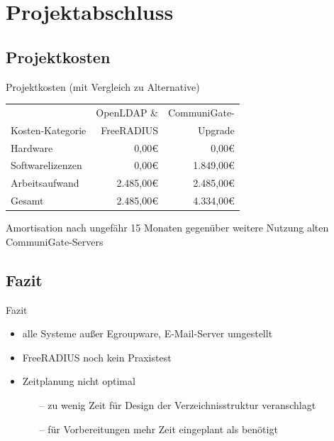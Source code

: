 \documentclass[presentation,svgnames,12pt]{beamer}
\begin{document}
\section{Projektabschluss}
\subsection{Projektkosten}
\begin{frame}{Projektkosten (mit Vergleich zu Alternative)}
\begin{table}
\centering
	\begin{tabularx}{0.9\textwidth}{|X|r|r|}
		\hline
		 	&	OpenLDAP \& &	CommuniGate-\\
		Kosten-Kategorie	&	FreeRADIUS &	Upgrade\\
		\hline
		Hardware &	0,00\euro{} &	0,00\euro{}\\
		\hline
		Softwarelizenzen &	0,00\euro{} &	1.849,00\euro{}\\
		\hline
		Arbeitsaufwand &	2.485,00\euro{} &	2.485,00\euro{}\\
		\hhline{|=|=|=|}
		Gesamt &	2.485,00\euro{} &	4.334,00\euro{}\\
		\hline
	\end{tabularx}
\end{table}
\bigskip
Amortisation nach ungefähr 15 Monaten gegenüber weitere Nutzung alten CommuniGate-Servers
\end{frame}

\subsection{Fazit}
\begin{frame}{Fazit}
\begin{itemize}
	\item alle Systeme außer Egroupware, E-Mail-Server umgestellt
	\item FreeRADIUS noch kein Praxistest
	\item Zeitplanung nicht optimal
	\vspace{6pt}
	\begin{itemize}
		\item[--] zu wenig Zeit für Design der Verzeichnisstruktur veranschlagt
		\item[--] für Vorbereitungen mehr Zeit eingeplant als benötigt
	\end{itemize}
\end{itemize}
\end{frame}
\end{document}
